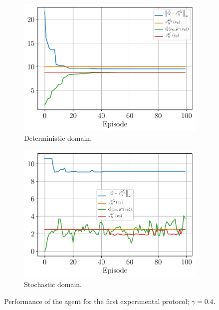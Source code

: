 \documentclass[a4paper, 12pt]{article}
\begin{document}
    \begin{figure}[h]
        \begin{subfigure}[b]{0.47\textwidth}
            \centering
            \includegraphics[width=\textwidth]{resources/pdf/5.3_deterministic.pdf}
            \caption{Deterministic domain.}
        \end{subfigure}
        \hfill
        \begin{subfigure}[b]{0.47\textwidth}
            \centering
            \includegraphics[width=\textwidth]{resources/pdf/5.3_stochastic.pdf}
            \caption{Stochastic domain.}
        \end{subfigure}
        \caption{Performance of the agent for the first experimental protocol; $\gamma = \num{0.4}$.}
        \label{fig:ql.first.protocol.gamma}
    \end{figure}
    
\end{document}
